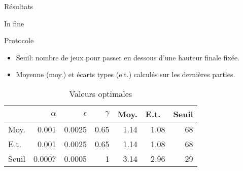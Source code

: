 \documentclass[tikz, footheight=2em]{beamer}
\begin{document}
\begin{frame}[c]{Résultats}
  \begin{figure}[H]
  \end{figure}
\end{frame}

\begin{frame}[c]{In fine}
  \begin{block}{Protocole}
    \begin{itemize}
      \item Seuil: nombre de jeux pour passer en dessous d'une hauteur finale
        fixée.
      \item Moyenne (moy.) et écarts types (e.t.) calculés sur les dernières
        parties.
    \end{itemize}
  \end{block}
  \pause{}
  \begin{table}
    \centering
    \begin{tabulary}{\linewidth}{|C|r|r|r||r|r|r|}
      \hline
      & \(\alpha\) & \(\epsilon\) & \(\gamma\) & Moy. & E.t.\ & Seuil\\
      \hline
      Moy. & 0.001 & 0.0025 & 0.65 & 1.14 & 1.08 & 68\\
      \hline
      E.t.\ & 0.001 & 0.0025 & 0.65 & 1.14 & 1.08 & 68\\
      \hline
      Seuil & 0.0007 & 0.0005 & 1 & 3.14 & 2.96 & 29\\
      \hline
    \end{tabulary}
    \caption{Valeurs optimales}\label{tab:param}
  \end{table}
\end{frame}
\end{document}
